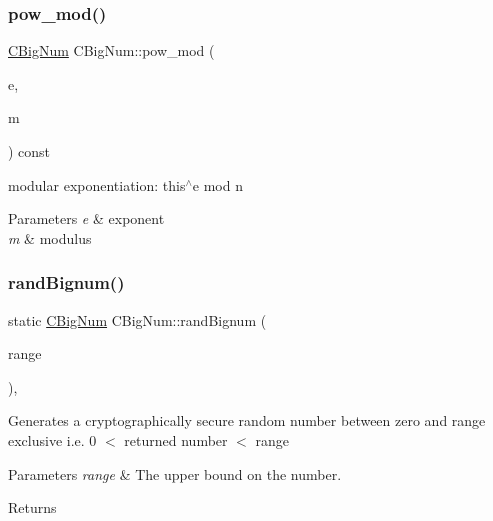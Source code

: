 \subsubsection{\texorpdfstring{pow\_mod()}{pow\_mod()}}
{\footnotesize\ttfamily \mbox{\hyperlink{class_c_big_num}{C\+Big\+Num}} C\+Big\+Num\+::pow\+\_\+mod (\begin{DoxyParamCaption}\item[{const \mbox{\hyperlink{class_c_big_num}{C\+Big\+Num}} \&}]{e,  }\item[{const \mbox{\hyperlink{class_c_big_num}{C\+Big\+Num}} \&}]{m }\end{DoxyParamCaption}) const\hspace{0.3cm}{\ttfamily [inline]}}

modular exponentiation\+: this$^\wedge$e mod n 
\begin{DoxyParams}{Parameters}
{\em e} & exponent \\
\hline
{\em m} & modulus \\
\hline
\end{DoxyParams}
\mbox{\label{class_c_big_num_a83e20522f042dd2b738bd26e21605e3b}} 
\subsubsection{\texorpdfstring{randBignum()}{randBignum()}}
{\footnotesize\ttfamily static \mbox{\hyperlink{class_c_big_num}{C\+Big\+Num}} C\+Big\+Num\+::rand\+Bignum (\begin{DoxyParamCaption}\item[{const \mbox{\hyperlink{class_c_big_num}{C\+Big\+Num}} \&}]{range }\end{DoxyParamCaption})\hspace{0.3cm}{\ttfamily [inline]}, {\ttfamily [static]}}

Generates a cryptographically secure random number between zero and range exclusive i.\+e. 0 $<$ returned number $<$ range 
\begin{DoxyParams}{Parameters}
{\em range} & The upper bound on the number. \\
\hline
\end{DoxyParams}
\begin{DoxyReturn}{Returns}

\end{DoxyReturn}
\mbox{\label{class_c_big_num_a200174f8261baebceb64b24a2d91f33f}} 
